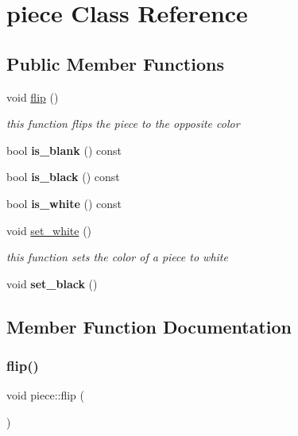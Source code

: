 \hypertarget{classpiece}{}\section{piece Class Reference}
\label{classpiece}
\subsection*{Public Member Functions}
\begin{DoxyCompactItemize}
\item 
void \hyperlink{classpiece_ab898c5827a5859e4cddc9d61a814a873}{flip} ()
\begin{DoxyCompactList}\small\item\em this function flips the piece to the opposite color \end{DoxyCompactList}\item 
\mbox{\label{classpiece_aa1eda7729e0f3383a813fc6ccc4e7e3c}} 
bool {\bfseries is\+\_\+blank} () const
\item 
\mbox{\label{classpiece_a103dccd216cb495d1c42b2465778be53}} 
bool {\bfseries is\+\_\+black} () const
\item 
\mbox{\label{classpiece_ae9dde29687fcb2b7badc6cb5395a13f2}} 
bool {\bfseries is\+\_\+white} () const
\item 
void \hyperlink{classpiece_a31480899f2a591fdb22d97933303e19d}{set\+\_\+white} ()
\begin{DoxyCompactList}\small\item\em this function sets the color of a piece to white \end{DoxyCompactList}\item 
\mbox{\label{classpiece_a273d63d07b6ea973b2fc4f7e1b56ea10}} 
void {\bfseries set\+\_\+black} ()
\end{DoxyCompactItemize}


\subsection{Member Function Documentation}
\mbox{\label{classpiece_ab898c5827a5859e4cddc9d61a814a873}} 
\subsubsection{\texorpdfstring{flip()}{flip()}}
{\footnotesize\ttfamily void piece\+::flip (\begin{DoxyParamCaption}{ }\end{DoxyParamCaption})\hspace{0.3cm}{\ttfamily [inline]}}



